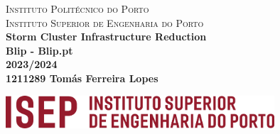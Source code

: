 \begin{titlepage}
    \center 

    \textsc{
        Instituto Politécnico do Porto\\[3mm]
        \LARGE Instituto Superior de Engenharia do Porto
    }
    \HRuleFront
    \\[4cm]

    {\huge \bfseries Storm Cluster Infrastructure Reduction}\\[.5cm]

    {\bfseries Blip - Blip.pt }\\[1cm]
    {\Large \bfseries 2023/2024}\\[2cm]

    {\Large\bf 1211289 Tomás Ferreira Lopes}


    \vfill

    \includegraphics[width=10cm, keepaspectratio]{media/isep/isep.jpg}\\

\end{titlepage}
